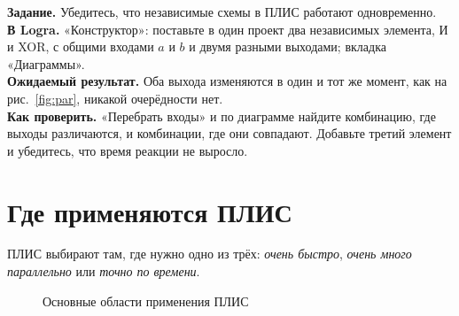 \begin{diybox}
\textbf{Задание.} Убедитесь, что независимые схемы в ПЛИС работают одновременно.\\
\textbf{В Logra.} «Конструктор»: поставьте в один проект два независимых элемента, И и XOR, с общими входами $a$ и $b$ и двумя разными выходами; вкладка «Диаграммы».\\
\textbf{Ожидаемый результат.} Оба выхода изменяются в один и тот же момент, как на рис.~\ref{fig:par}, никакой очерёдности нет.\\
\textbf{Как проверить.} «Перебрать входы» и по диаграмме найдите комбинацию, где выходы различаются, и комбинации, где они совпадают.  Добавьте третий элемент и убедитесь, что время реакции не выросло.
\end{diybox}

\section{Где применяются ПЛИС}

ПЛИС выбирают там, где нужно одно из трёх: \emph{очень быстро},
\emph{очень много параллельно} или \emph{точно по времени}.

\begin{figure}[H]
\centering
{}
\caption{Основные области применения ПЛИС}
\end{figure}

